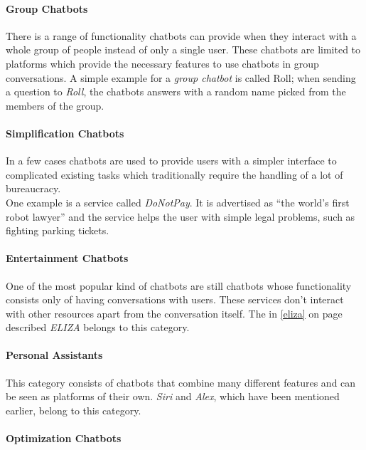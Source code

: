 \paragraph{Group Chatbots}

There is a range of functionality chatbots can provide when they interact with a whole group of people instead of only a single user.
These chatbots are limited to platforms which provide the necessary features to use chatbots in group conversations.
A simple example for a \emph{group chatbot} is called Roll\cite{venturebeat};
when sending a question to \emph{Roll}, the chatbots answers with a random name picked from the members of the group.


\paragraph{Simplification Chatbots}

In a few cases chatbots are used to provide users with a simpler interface to complicated existing tasks which traditionally require the handling of a lot of bureaucracy.
\\
One example is a service called \emph{DoNotPay}.
It is advertised as ``the world's first robot lawyer''\cite{oreilly} and the service helps the user with simple legal problems,
such as fighting parking tickets.


\paragraph{Entertainment Chatbots}

One of the most popular kind of chatbots are still chatbots whose functionality consists only of having conversations with users.
These services don't interact with other resources apart from the conversation itself.
The in \ref{eliza} on page \pageref{eliza} described \emph{ELIZA} belongs to this category.


\paragraph{Personal Assistants}
\label{assistants}

This category consists of chatbots that combine many different features and can be seen as platforms of their own.
\emph{Siri} and \emph{Alex}, which have been mentioned earlier, belong to this category.


\paragraph{Optimization Chatbots}

